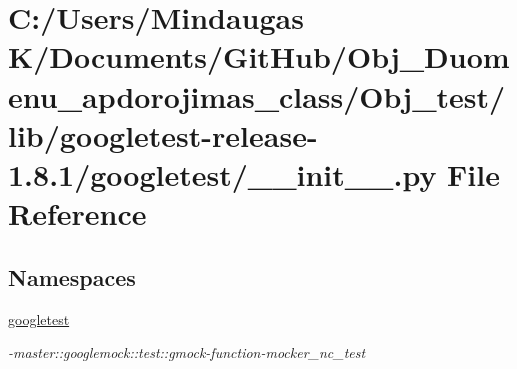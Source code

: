\hypertarget{_obj__test_2lib_2googletest-release-1_88_81_2googletest_2____init_____8py}{}\section{C\+:/\+Users/\+Mindaugas K/\+Documents/\+Git\+Hub/\+Obj\+\_\+\+Duomenu\+\_\+apdorojimas\+\_\+class/\+Obj\+\_\+test/lib/googletest-\/release-\/1.8.1/googletest/\+\_\+\+\_\+init\+\_\+\+\_\+.py File Reference}
\label{_obj__test_2lib_2googletest-release-1_88_81_2googletest_2____init_____8py}
\subsection*{Namespaces}
\begin{DoxyCompactItemize}
\item 
 \mbox{\hyperlink{namespacegoogletest}{googletest}}
\begin{DoxyCompactList}\small\item\em -\/master\+::googlemock\+::test\+::gmock-\/function-\/mocker\+\_\+nc\+\_\+test \end{DoxyCompactList}\end{DoxyCompactItemize}
